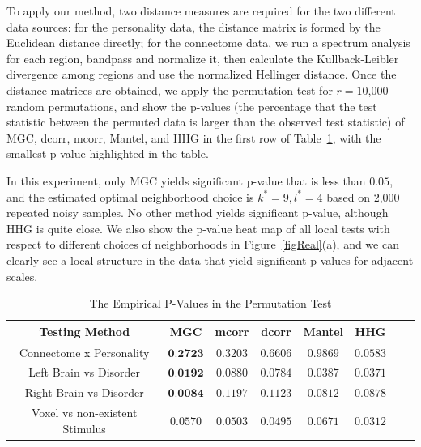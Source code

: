 \documentclass[11pt]{article}
\newcommand{\cs}[1]{{\color{blue}{#1}}}
\begin{document}
To apply our method, two distance measures are required for the two different data sources: for the personality data, the distance matrix is formed by the Euclidean distance directly; for the connectome data, we run a spectrum analysis for each region, bandpass and normalize it, then calculate the Kullback-Leibler divergence among regions and use the normalized Hellinger distance. Once the distance matrices are obtained, we apply the permutation test for $r=10$,$000$ random permutations, and show the p-values (the percentage that the test statistic between the permuted data is larger than the observed test statistic) of MGC, dcorr, mcorr, Mantel, and HHG in the first row of Table~\ref{table1}, with the smallest p-value highlighted in the table. 

In this experiment, only MGC yields significant p-value that is less than $0.05$, and the estimated optimal neighborhood choice is $k^{*}=9, l^{*}=4$ based on $2$,$000$ repeated noisy samples. No other method yields significant p-value, although HHG is quite close. We also show the p-value heat map of all local tests with respect to different choices of neighborhoods in Figure~\ref{figReal}(a), and we can clearly see a local structure in the data that yield significant p-values for adjacent scales.

\cs{we should replace the above experiment by others, or just abandon it; since the MGC p-value is now 0.15 for connectome vs personality, after the current bias adjustment, which is higher than HHG; and no method yields significance for this data set now.}


\begin{table}[!t]
\footnotesize
\renewcommand{\arraystretch}{0.5}
\centering
{\begin{tabular}{|c||c|c|c|c|c|c|c|}
\hline
Testing Method & MGC & mcorr & dcorr & Mantel & HHG \\
\hline
Connectome x Personality & $\textbf{0.2723}$ & $0.3203$ & $0.6606$ & $0.9869$  & $0.0583$ \\
\hline
Left Brain vs Disorder  & $\textbf{0.0192}$ & $0.0880$ & $0.0784$ & $0.0387$ & $0.0371$ \\
\hline
Right Brain vs Disorder & $\textbf{0.0084}$ & $0.1197$ & $0.1123$  & $0.0812$ & $0.0878$\\
\hline
Voxel vs non-existent Stimulus & $0.0570$ & $0.0503$ & $0.0495$  & $0.0671$ & $0.0312$\\
\hline
\end{tabular}
\caption{The Empirical P-Values in the Permutation Test}
\label{table1}
}
\end{table}
\end{document}
